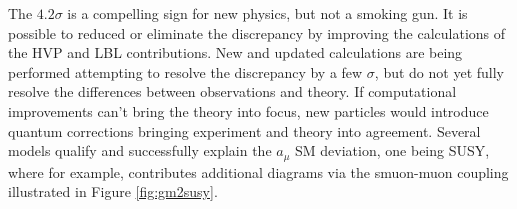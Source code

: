 
The $4.2\sigma$  is a compelling sign for new physics, but not a smoking gun. It is possible to reduced or eliminate the discrepancy by improving the calculations of the HVP and LBL contributions. New and updated calculations are being performed attempting to resolve the discrepancy by a few $\sigma$, but do not yet fully resolve the differences between observations and theory. If computational improvements can't bring the theory into focus, new particles would introduce  quantum corrections bringing experiment and theory into agreement. Several models qualify and successfully explain the $a_\mu$ SM deviation, one being SUSY, where for example, contributes additional diagrams via the smuon-muon coupling illustrated in Figure \ref{fig:gm2susy}.

